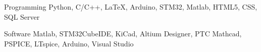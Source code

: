 


\begin{cvskills}


\cvskill
{Programming} %
{Python, C/C++, LaTeX, Arduino, STM32, Matlab, HTML5, CSS, SQL Server} %


\cvskill
{Software} %
{Matlab, STM32CubeIDE, KiCad, Altium Designer, PTC Mathcad, PSPICE, LTspice, Arduino, Visual Studio} %




\end{cvskills}